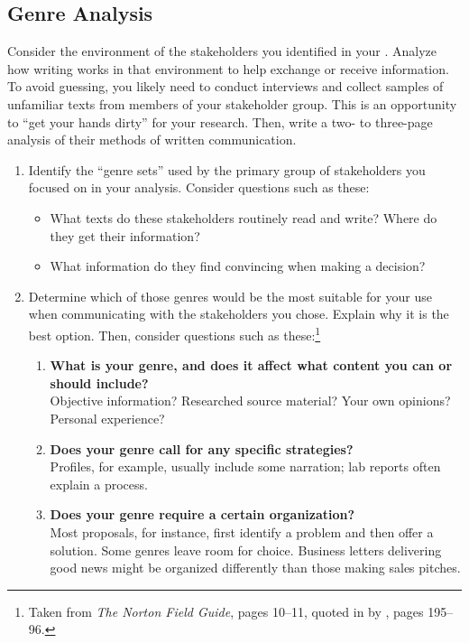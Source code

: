 \documentclass[11pt, twosides]{amsart}	%
\begin{document}
\subsection{Genre Analysis} %
\label{sub:genre_analysis}
Consider the environment of the stakeholders you identified in your . Analyze how writing works in that environment to help exchange or receive information. To avoid guessing, you likely need to conduct interviews %
and collect samples of unfamiliar texts from members of your stakeholder group. This is an opportunity to ``get your hands dirty'' for your research. Then, write a two- to three-page analysis of their methods of written communication.
	\begin{enumerate} %
		\item  Identify the ``genre sets'' used by the primary group of stakeholders you focused on in your analysis. Consider questions such as these:
		\begin{itemize}
			\item What texts do these stakeholders routinely read and write? Where do they get their information? 
			\item  What information do they find convincing when making a decision?
		\end{itemize}
		\item Determine which of those genres would be the most suitable for your use when communicating with the stakeholders you chose. Explain why it is the best option. Then, consider questions such as these:\footnote{Taken from \emph{The Norton Field Guide}, pages 10–11, quoted in  by \citeauthor{bawarshi2010genre}, pages 195–96.}
		\begin{enumerate}
	\item \textbf{What is your genre, and does it affect what content you can or should include?}\\ Objective information? Researched source material? Your own opinions? Personal experience?
\item \textbf{Does your genre call for any specific strategies?}\\ Profiles, for example, usually include some narration; lab reports often explain a process.
\item \textbf{Does your genre require a certain organization?}\\ Most proposals, for instance, first identify a problem and then offer a solution. Some genres leave room for choice. Business letters delivering good news might be organized differently than those making sales pitches.

\end{enumerate}
\end{enumerate}
\end{document}
